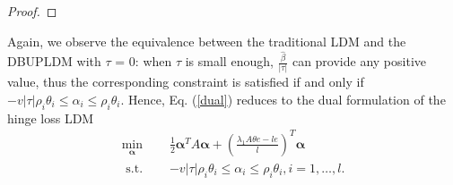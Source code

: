 \documentclass[a4paper]{cas-sc}
\begin{document}
\begin{proof}

\end{proof}

Again, we observe the equivalence between the traditional LDM and the DBUPLDM with $\tau$ = 0: when $\tau$ is small enough, $\frac{\hat{\beta}}{|\tau|}$ can provide any positive value, thus the corresponding constraint is satisfied if and only if $-v\left| \tau \right|\rho_{i}\theta_{i} \leq \alpha_{i} \leq \rho_{i}\theta_{i}$. Hence, Eq. (\ref{dual}) reduces to the dual formulation of the hinge loss LDM
\begin{equation}
\label{ldmdual}
\begin{aligned}
\min _{\boldsymbol{\alpha}} & \frac{1}{2} \boldsymbol{\alpha}^{T} A \boldsymbol{\alpha}+\left(\frac{\lambda_{1} A\mathbb{\theta}e-l e}{l}\right)^{T} \boldsymbol{\alpha} \\
\text { s.t. } \quad &  -v\left| \tau \right|\rho_{i}\theta_{i} \leq \alpha_{i} \leq \rho_{i}\theta_{i}, i=1, \ldots, l.
\end{aligned}
\end{equation}
\end{document}
